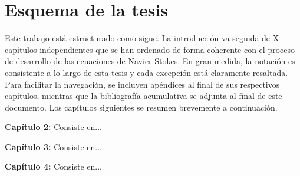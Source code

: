 \section{Esquema de la tesis}
Este trabajo está estructurado como sigue. La introducción va seguida de X capítulos independientes que se han ordenado de forma coherente con el proceso de desarrollo de las ecuaciones de Navier-Stokes. En gran medida, la notación es consistente a lo largo de esta tesis y cada excepción está claramente resaltada. Para facilitar la navegación, se incluyen apéndices al final de sus respectivos capítulos, mientras que la bibliografía acumulativa se adjunta al final de este documento. Los capítulos siguientes se resumen brevemente a continuación.

\textbf{Capítulo 2:} Consiste en...


\textbf{Capítulo 3:} Consiste en...


\textbf{Capítulo 4:} Consiste en...

